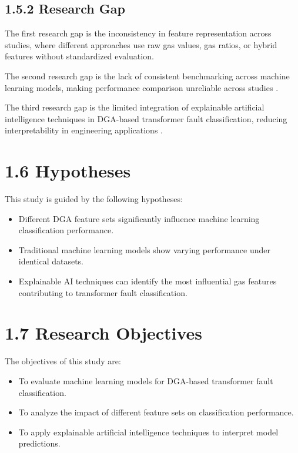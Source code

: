 \subsection{1.5.2 Research Gap}

The first research gap is the inconsistency in feature representation across studies, where different approaches use raw gas values, gas ratios, or hybrid features without standardized evaluation.

The second research gap is the lack of consistent benchmarking across machine learning models, making performance comparison unreliable across studies \parencite{Dladla2025SLR}.

The third research gap is the limited integration of explainable artificial intelligence techniques in DGA-based transformer fault classification, reducing interpretability in engineering applications \parencite{Zhang2022BiLevelXAI}.

\section{1.6 Hypotheses}

This study is guided by the following hypotheses:

\begin{itemize}
\item Different DGA feature sets significantly influence machine learning classification performance.
\item Traditional machine learning models show varying performance under identical datasets.
\item Explainable AI techniques can identify the most influential gas features contributing to transformer fault classification.
\end{itemize}

\section{1.7 Research Objectives}

The objectives of this study are:

\begin{itemize}
\item To evaluate machine learning models for DGA-based transformer fault classification.
\item To analyze the impact of different feature sets on classification performance.
\item To apply explainable artificial intelligence techniques to interpret model predictions.
\end{itemize}

